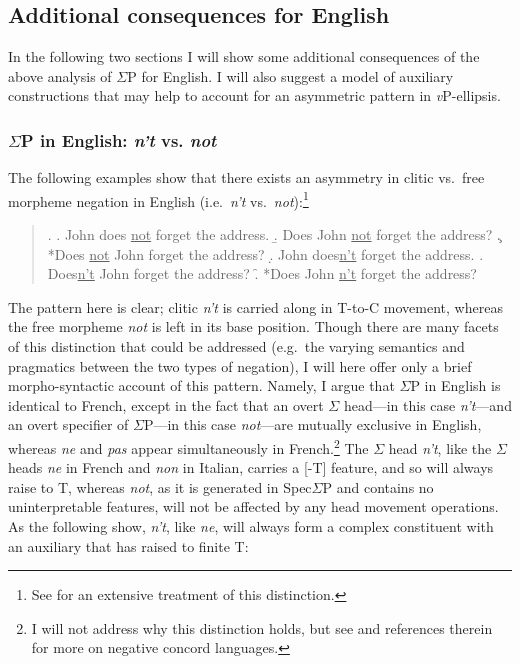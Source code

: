 \subsection{Additional consequences for English}
In the following two sections I will show some additional consequences of the above analysis of $\Sigma$P for English. I will also suggest a model of auxiliary constructions that may help to account for an asymmetric pattern in {\it v}P-ellipsis.

\subsubsection{$\Sigma$P in English: \textit{n't} vs. \textit{not}}
The following examples show that there exists an asymmetry in clitic vs.\ free morpheme negation in English (i.e.\ {\it n't} vs.\ {\it not}):\footnote{See \citet{zwicky_pullum1983} for an extensive treatment of this distinction.}

\singlespacing
\begin{quote}
\ex.
\a. John does \underline{not} forget the address.
\b. Does John \underline{not} forget the address?
\c. *Does \underline{not} John forget the address?
\d. John does\underline{n't} forget the address.
\e. Does\underline{n't} John forget the address?
\f. *Does John \underline{n't} forget the address?

\end{quote}
\onehalfspacing
The pattern here is clear; clitic {\it n't} is carried along in T-to-C movement, whereas the free morpheme {\it not} is left in its base position. Though there are many facets of this distinction that could be addressed (e.g.\ the varying semantics and pragmatics between the two types of negation), I will here offer only a brief morpho-syntactic account of this pattern. Namely, I argue that $\Sigma$P in English is identical to French, except in the fact that an overt $\Sigma$ head---in this case {\it n't}---and an overt specifier of $\Sigma$P---in this case {\it not}---are mutually exclusive in English, whereas {\it ne} and {\it pas} appear simultaneously in French.\footnote{I will not address why this distinction holds, but see \citet{watanabe2004} and references therein for more on negative concord languages.} The $\Sigma$ head {\it n't}, like the $\Sigma$ heads {\it ne} in French and {\it non} in Italian, carries a [-T] feature, and so will always raise to T, whereas {\it not}, as it is generated in Spec$\Sigma$P and contains no uninterpretable features, will not be affected by any head movement operations. As the following show, {\it n't}, like {\it ne}, will always form a complex constituent with an auxiliary that has raised to finite T:

